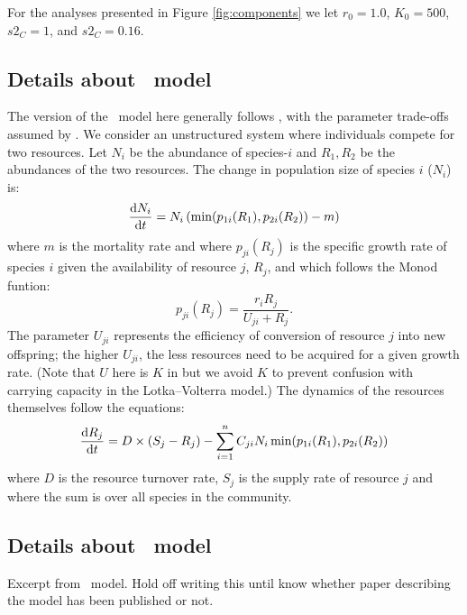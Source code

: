 \documentclass[a4paper,11pt]{article}
\begin{document}
For the analyses presented in Figure \ref{fig:components} we let $r_0=1.0$, $K_0=500$,
 $s2_C=1$, and $s2_C=0.16$.

\subsection{Details about \Rstar\ model}\label{sec:Rstar}

The version of the \Rstar\ model here generally follows
\citet{Huisman-2001}, with the parameter trade-offs assumed by
\citet{Fox-2008}.
%
We consider an unstructured system where individuals compete for two
resources. Let $N_i$ be the abundance of species-$i$ and $R_1, R_2$ be
the abundances of the two resources.
%
The change in population size of species $i$ ($N_i$) is:
\begin{equation}
  \label{eq:rstar-n}
  \frac{\mathrm{d} N_i}{\mathrm{d} t} = N_i \, (\min(p_{1i}(R_1), p_{2i}(R_2)) - m)
\end{equation}
where $m$ is the mortality rate and where $p_{ji}(R_j)$ is the
specific growth rate of species $i$ given the availability of resource
$j$, $R_j$, and which follows the Monod funtion:
\begin{equation}
  \label{eq:rstar-p}
  p_{ji}(R_j) = \frac{r_i R_j}{U_{ji} + R_j}.
\end{equation}
%
The parameter $U_{ji}$ represents the efficiency of conversion of
resource $j$ into new offspring; the higher $U_{ji}$, the less
resources need to be acquired for a given growth rate.  (Note that $U$
here is $K$ in \citealt{Huisman-2001} but we avoid $K$ to prevent
confusion with carrying capacity in the Lotka--Volterra model.)
%
The dynamics of the resources themselves follow the equations:
\begin{equation}
  \label{eq:rstar-r}
  \frac{\mathrm{d} R_j}{\mathrm{d} t} =
  D \times (S_j - R_j) - \sum_{i=1}^n {C_{ji} N_i
    \min(p_{1i}(R_1), p_{2i}(R_2))}
\end{equation}
where $D$ is the resource turnover rate, $S_j$ is the supply rate of
resource $j$ and where the sum is over all species in the community.


\subsection{Details about \plant\ model}\label{sec:plant}

Excerpt from  \plant\ model. Hold off writing this until know whether paper describing
the model has been published or not.
\end{document}
